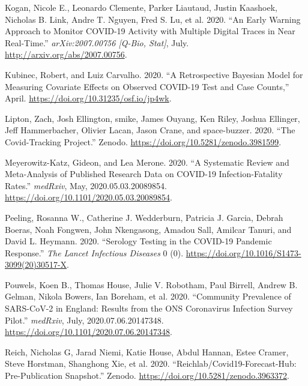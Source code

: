 \documentclass[10pt,letterpaper]{article}
\newlength{\cslhangindent}
\newenvironment{cslreferences}%
  {\setlength{\parindent}{0pt}%
  \everypar{\setlength{\hangindent}{\cslhangindent}}\ignorespaces}%
  {\par}
\begin{document}
\begin{cslreferences}
\leavevmode\hypertarget{ref-koganEarlyWarningApproach2020}{}%
Kogan, Nicole E., Leonardo Clemente, Parker Liautaud, Justin Kaashoek,
Nicholas B. Link, Andre T. Nguyen, Fred S. Lu, et al. 2020. ``An Early
Warning Approach to Monitor COVID-19 Activity with Multiple Digital
Traces in Near Real-Time.'' \emph{arXiv:2007.00756 {[}Q-Bio, Stat{]}},
July. \url{http://arxiv.org/abs/2007.00756}.

\leavevmode\hypertarget{ref-kubinecRetrospectiveBayesianModel2020}{}%
Kubinec, Robert, and Luiz Carvalho. 2020. ``A Retrospective Bayesian
Model for Measuring Covariate Effects on Observed COVID-19 Test and Case
Counts,'' April. \url{https://doi.org/10.31235/osf.io/jp4wk}.

\leavevmode\hypertarget{ref-zachliptonCovidTrackingProject2020}{}%
Lipton, Zach, Josh Ellington, smike, James Ouyang, Ken Riley, Joshua
Ellinger, Jeff Hammerbacher, Olivier Lacan, Jason Crane, and
space-buzzer. 2020. ``The Covid-Tracking Project.'' Zenodo.
\url{https://doi.org/10.5281/zenodo.3981599}.

\leavevmode\hypertarget{ref-meyerowitz-katzSystematicReviewMetaanalysis2020}{}%
Meyerowitz-Katz, Gideon, and Lea Merone. 2020. ``A Systematic Review and
Meta-Analysis of Published Research Data on COVID-19 Infection-Fatality
Rates.'' \emph{medRxiv}, May, 2020.05.03.20089854.
\url{https://doi.org/10.1101/2020.05.03.20089854}.

\leavevmode\hypertarget{ref-peelingSerologyTestingCOVID192020}{}%
Peeling, Rosanna W., Catherine J. Wedderburn, Patricia J. Garcia, Debrah
Boeras, Noah Fongwen, John Nkengasong, Amadou Sall, Amilcar Tanuri, and
David L. Heymann. 2020. ``Serology Testing in the COVID-19 Pandemic
Response.'' \emph{The Lancet Infectious Diseases} 0 (0).
\url{https://doi.org/10.1016/S1473-3099(20)30517-X}.

\leavevmode\hypertarget{ref-pouwelsCommunityPrevalenceSARSCoV22020}{}%
Pouwels, Koen B., Thomas House, Julie V. Robotham, Paul Birrell, Andrew
B. Gelman, Nikola Bowers, Ian Boreham, et al. 2020. ``Community
Prevalence of SARS-CoV-2 in England: Results from the ONS Coronavirus
Infection Survey Pilot.'' \emph{medRxiv}, July, 2020.07.06.20147348.
\url{https://doi.org/10.1101/2020.07.06.20147348}.

\leavevmode\hypertarget{ref-nicholasgreichReichlabCovid19forecasthubPrepublication2020}{}%
Reich, Nicholas G, Jarad Niemi, Katie House, Abdul Hannan, Estee Cramer,
Steve Horstman, Shanghong Xie, et al. 2020.
``Reichlab/Covid19-Forecast-Hub: Pre-Publication Snapshot.'' Zenodo.
\url{https://doi.org/10.5281/zenodo.3963372}.


\end{cslreferences}
\end{document}
